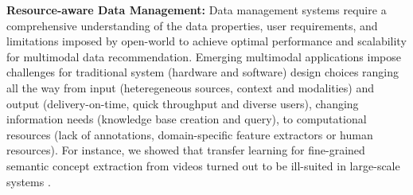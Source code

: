 \textbf{Resource-aware Data Management:}
%
%
Data management systems require a comprehensive understanding of the data properties, user requirements, and limitations imposed by open-world to achieve optimal performance and scalability 
for multimodal data recommendation. 
Emerging multimodal applications impose challenges for traditional system (hardware and software) design choices ranging all the way from input (heteregeneous sources, context and modalities) and output (delivery-on-time, quick throughput and diverse users), changing information needs (knowledge base creation and query), to computational resources (lack of annotations, domain-specific feature extractors or human resources). 
For instance, we showed that transfer learning for fine-grained semantic concept extraction from videos turned out to be ill-suited in large-scale systems \cite{stonebraker2020surveillance}.
